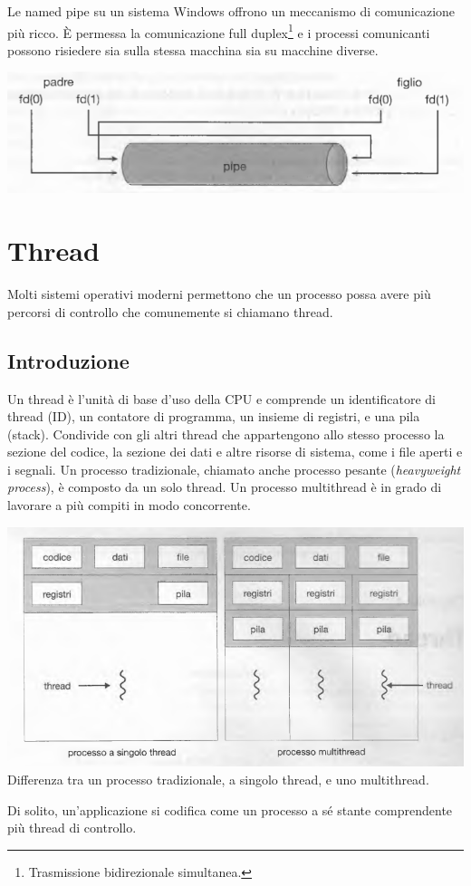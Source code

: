 \documentclass[11pt,a4paper]{article}
\begin{document}
Le named pipe su un sistema Windows offrono
un meccanismo di comunicazione più ricco. È permessa la comunicazione full duplex\footnote{Trasmissione bidirezionale simultanea.} e i processi comunicanti possono risiedere sia sulla stessa macchina sia su macchine diverse.
\begin{center}
  \includegraphics[scale=0.6]{img/0009.png}
\end{center}

\section{Thread}
Molti sistemi operativi moderni permettono
che un processo possa avere più percorsi di controllo che comunemente si chiamano thread.

\subsection{Introduzione}
Un thread è l'unità di base d'uso della CPU e comprende un identificatore di thread (ID), un
contatore di programma, un insieme di registri, e una pila (stack). Condivide con gli altri
thread che appartengono allo stesso processo la sezione del codice, la sezione dei dati e altre
risorse di sistema, come i file aperti e i segnali. Un processo tradizionale, chiamato anche
processo pesante (\emph{heavyweight process}), è composto da un solo thread. Un processo multi­thread è in grado di lavorare a più compiti in modo concorrente.
\begin{center}
  \includegraphics[scale=0.45]{img/0010.png}\\
  \caption{Differenza tra un processo tradizionale, a singolo thread, e uno multithread.}
\end{center}
Di solito, un'applicazione si codifica come un processo a sé stante comprendente
più thread di controllo.
\end{document}

